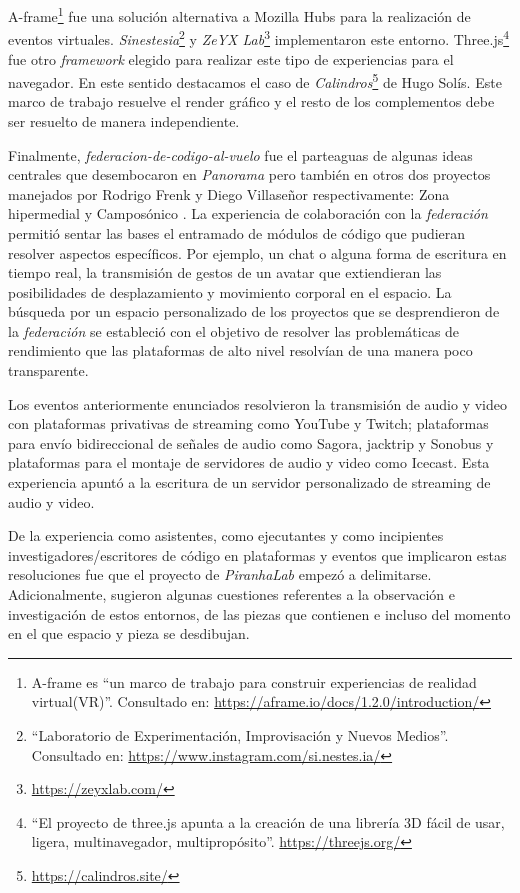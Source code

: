 A-frame\footnote{ A-frame es ``un marco de trabajo para construir experiencias de realidad virtual(VR)''. Consultado en: \url{https://aframe.io/docs/1.2.0/introduction/}} fue una solución alternativa a Mozilla Hubs para la realización de eventos virtuales. \textit{Sinestesia}\footnote{``Laboratorio de Experimentación, Improvisación y Nuevos Medios''. Consultado en: \url{https://www.instagram.com/si.nestes.ia/}} y \textit{ZeYX Lab}\footnote{\url{https://zeyxlab.com/}} implementaron este entorno. Three.js\footnote{``El proyecto de three.js apunta a la creación de una librería 3D fácil de usar, ligera, multinavegador, multipropósito''. \url{https://threejs.org/}} fue otro \textit{framework} elegido para realizar este tipo de experiencias para el navegador. En este sentido destacamos el caso de \textit{Calindros}\footnote{\url{https://calindros.site/}} de Hugo Solís. Este marco de trabajo resuelve el render gráfico y el resto de los complementos debe ser resuelto de manera independiente. %

Finalmente, \textit{federacion-de-codigo-al-vuelo} \citep{en-vivo} fue el parteaguas de algunas ideas centrales que desembocaron en \textit{Panorama} pero también en otros dos proyectos manejados por Rodrigo Frenk y Diego Villaseñor respectivamente: Zona hipermedial y Camposónico \citep{camposonico}. La experiencia de colaboración con la \textit{federación} permitió sentar las bases el entramado de módulos de código que pudieran resolver aspectos específicos. Por ejemplo,  un chat o alguna forma de escritura en tiempo real, la transmisión de gestos de un avatar que extiendieran las posibilidades de desplazamiento y movimiento corporal en el espacio. La búsqueda por un espacio personalizado de los proyectos que se desprendieron de la \textit{federación} se estableció con el objetivo de resolver las problemáticas de rendimiento que las plataformas de alto nivel resolvían de una manera poco transparente. 

Los eventos anteriormente enunciados resolvieron la transmisión de audio y video con  plataformas privativas de streaming como YouTube y Twitch; plataformas para envío bidireccional de señales de audio como Sagora, jacktrip y Sonobus y plataformas para el montaje de servidores de audio y video como Icecast. Esta experiencia apuntó a la escritura de un servidor personalizado de streaming de audio y video. %

De la experiencia como asistentes, como ejecutantes y como incipientes investigadores/escritores de código en plataformas y eventos que implicaron estas resoluciones fue que el proyecto de \textit{PiranhaLab} empezó a delimitarse. Adicionalmente, sugieron algunas cuestiones referentes a la observación e investigación de estos entornos, de las piezas que contienen e incluso del momento en el que espacio y pieza se desdibujan. 
